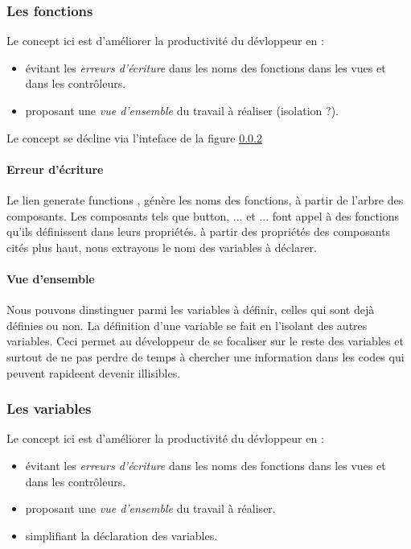 \documentclass[a4paper,11pt]{report}
\begin{document}
	

\subsubsection{ Les fonctions}
Le concept ici est d'améliorer la productivité du dévloppeur en :
\begin{itemize}
\item évitant les {\em erreurs d'écriture} dans les noms des
fonctions dans les vues et dans les contrôleurs.
\item proposant une {\em vue d'ensemble} du travail à réaliser (isolation ?).
\end{itemize}

Le concept se décline via l'inteface de la figure \ref{}

\paragraph{Erreur d'écriture}
Le lien \og generate functions \fg, génère les noms des fonctions, à
partir de l'arbre des composants. Les composants tels que button,
... et ... font appel à des fonctions qu'ils définissent dans leurs
propriétés. à partir des propriétés des composants cités plus haut,
nous extrayons le nom des variables à déclarer.

\paragraph{Vue d'ensemble}
Nous pouvons dinstinguer parmi les variables à définir, celles qui
sont dejà définies ou non. La définition d'une variable se fait en
l'isolant des autres variables. Ceci permet au
développeur de se focaliser sur le reste des variables et surtout de
ne pas perdre de temps à chercher une information dans les codes qui
peuvent rapideent devenir illisibles.

\subsubsection{Les variables}
Le concept ici est d'améliorer la productivité du dévloppeur en :
\begin{itemize}
\item évitant les {\em erreurs d'écriture} dans les noms des
fonctions dans les vues et dans les contrôleurs.
\item proposant une {\em vue d'ensemble} du travail à réaliser.
\item simplifiant la déclaration des variables.

\end{itemize}
\end{document}
